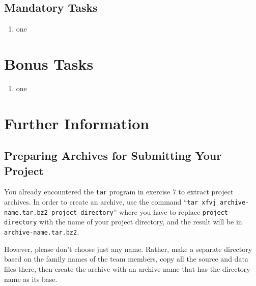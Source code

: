 \documentclass[a4paper,10pt]{article}
\begin{document}
\subsection{Mandatory Tasks}

\begin{enumerate}

\item
  one

\end{enumerate}



\section{Bonus Tasks}

\begin{enumerate}

\item
  one
  
\end{enumerate}



\section{Further Information}

\subsection*{Preparing Archives for Submitting Your Project}

You already encountered the \texttt{tar} program in exercise 7 to extract project archives.
In order to create an archive, use the command ``\texttt{tar xfvj archive-name.tar.bz2 project-directory}'' where you have to replace \texttt{project-directory} with the name of your project directory, and the result will be in \texttt{archive-name.tar.bz2}.

However, please don't choose just any name.
Rather, make a separate directory based on the family names of the team members, copy all the source and data files there, then create the archive with an archive name that has the directory name as its base.
\end{document}
